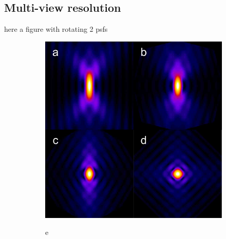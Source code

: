   \subsection{Multi-view resolution}
    \label{sec:120concept}
    here a figure with rotating 2 psfs
    \begin{figure}[bt]
      \centering
      \begin{subfigure}[t]{0.45\textwidth}
        \includegraphics[width=\columnwidth]{simu/psf}
      \end{subfigure}	
      \begin{subfigure}[b]{0.5\textwidth}
      \qquad e
      

\end{subfigure}
\end{figure}
